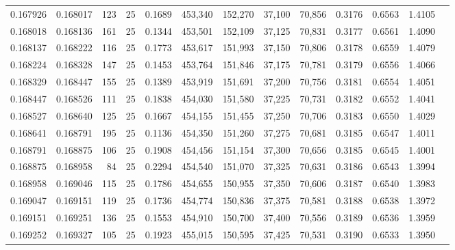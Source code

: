 \begin{tabular}{rrrrrrrrrrrrr}
0.167926 & 0.168017 &   123 &  25 &                                     0.1689 & 453,340 & 152,270 &  37,100 &  70,856 & 0.3176 & 0.6563 & 1.4105 \\
0.168018 & 0.168136 &   161 &  25 &                                     0.1344 & 453,501 & 152,109 &  37,125 &  70,831 & 0.3177 & 0.6561 & 1.4090 \\
0.168137 & 0.168222 &   116 &  25 &                                     0.1773 & 453,617 & 151,993 &  37,150 &  70,806 & 0.3178 & 0.6559 & 1.4079 \\
0.168224 & 0.168328 &   147 &  25 &                                     0.1453 & 453,764 & 151,846 &  37,175 &  70,781 & 0.3179 & 0.6556 & 1.4066 \\
0.168329 & 0.168447 &   155 &  25 &                                     0.1389 & 453,919 & 151,691 &  37,200 &  70,756 & 0.3181 & 0.6554 & 1.4051 \\
0.168447 & 0.168526 &   111 &  25 &                                     0.1838 & 454,030 & 151,580 &  37,225 &  70,731 & 0.3182 & 0.6552 & 1.4041 \\
0.168527 & 0.168640 &   125 &  25 &                                     0.1667 & 454,155 & 151,455 &  37,250 &  70,706 & 0.3183 & 0.6550 & 1.4029 \\
0.168641 & 0.168791 &   195 &  25 &                                     0.1136 & 454,350 & 151,260 &  37,275 &  70,681 & 0.3185 & 0.6547 & 1.4011 \\
0.168791 & 0.168875 &   106 &  25 &                                     0.1908 & 454,456 & 151,154 &  37,300 &  70,656 & 0.3185 & 0.6545 & 1.4001 \\
0.168875 & 0.168958 &    84 &  25 &                                     0.2294 & 454,540 & 151,070 &  37,325 &  70,631 & 0.3186 & 0.6543 & 1.3994 \\
0.168958 & 0.169046 &   115 &  25 &                                     0.1786 & 454,655 & 150,955 &  37,350 &  70,606 & 0.3187 & 0.6540 & 1.3983 \\
0.169047 & 0.169151 &   119 &  25 &                                     0.1736 & 454,774 & 150,836 &  37,375 &  70,581 & 0.3188 & 0.6538 & 1.3972 \\
0.169151 & 0.169251 &   136 &  25 &                                     0.1553 & 454,910 & 150,700 &  37,400 &  70,556 & 0.3189 & 0.6536 & 1.3959 \\
0.169252 & 0.169327 &   105 &  25 &                                     0.1923 & 455,015 & 150,595 &  37,425 &  70,531 & 0.3190 & 0.6533 & 1.3950 \\

\end{tabular}
